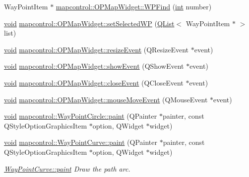 \begin{DoxyCompactItemize}
\item 
Way\-Point\-Item $\ast$ \hyperlink{group___o_p_map_widget_ga633b72f3ab012b8e9b8f6e58b75bfbb8}{mapcontrol\-::\-O\-P\-Map\-Widget\-::\-W\-P\-Find} (\hyperlink{ioapi_8h_a787fa3cf048117ba7123753c1e74fcd6}{int} number)
\item 
\hyperlink{group___u_a_v_objects_plugin_ga444cf2ff3f0ecbe028adce838d373f5c}{void} \hyperlink{group___o_p_map_widget_ga611fd47fbd108d887b40a1d1a878bd27}{mapcontrol\-::\-O\-P\-Map\-Widget\-::set\-Selected\-W\-P} (\hyperlink{class_q_list}{Q\-List}$<$ Way\-Point\-Item $\ast$ $>$ list)
\item 
\hyperlink{group___u_a_v_objects_plugin_ga444cf2ff3f0ecbe028adce838d373f5c}{void} \hyperlink{group___o_p_map_widget_gaeb81f004806916633910751cfe808de8}{mapcontrol\-::\-O\-P\-Map\-Widget\-::resize\-Event} (Q\-Resize\-Event $\ast$event)
\item 
\hyperlink{group___u_a_v_objects_plugin_ga444cf2ff3f0ecbe028adce838d373f5c}{void} \hyperlink{group___o_p_map_widget_gaa02db9787da06fe405061620b80605d4}{mapcontrol\-::\-O\-P\-Map\-Widget\-::show\-Event} (Q\-Show\-Event $\ast$event)
\item 
\hyperlink{group___u_a_v_objects_plugin_ga444cf2ff3f0ecbe028adce838d373f5c}{void} \hyperlink{group___o_p_map_widget_gabb098a73bed666626144c0da8332c609}{mapcontrol\-::\-O\-P\-Map\-Widget\-::close\-Event} (Q\-Close\-Event $\ast$event)
\item 
\hyperlink{group___u_a_v_objects_plugin_ga444cf2ff3f0ecbe028adce838d373f5c}{void} \hyperlink{group___o_p_map_widget_gaac8f40f4fe29d88750285c003b3f7b3f}{mapcontrol\-::\-O\-P\-Map\-Widget\-::mouse\-Move\-Event} (Q\-Mouse\-Event $\ast$event)
\item 
\hyperlink{group___u_a_v_objects_plugin_ga444cf2ff3f0ecbe028adce838d373f5c}{void} \hyperlink{group___o_p_map_widget_ga90e225e45f660d413d4d7ecac9bda3d9}{mapcontrol\-::\-Way\-Point\-Circle\-::paint} (Q\-Painter $\ast$painter, const Q\-Style\-Option\-Graphics\-Item $\ast$option, Q\-Widget $\ast$widget)
\item 
\hyperlink{group___u_a_v_objects_plugin_ga444cf2ff3f0ecbe028adce838d373f5c}{void} \hyperlink{group___o_p_map_widget_gaa2b1fdb88cca171d82b5705989370729}{mapcontrol\-::\-Way\-Point\-Curve\-::paint} (Q\-Painter $\ast$painter, const Q\-Style\-Option\-Graphics\-Item $\ast$option, Q\-Widget $\ast$widget)
\begin{DoxyCompactList}\small\item\em \hyperlink{group___o_p_map_widget_gaa2b1fdb88cca171d82b5705989370729}{Way\-Point\-Curve\-::paint} Draw the path arc. \end{DoxyCompactList}\item 

\end{DoxyCompactItemize}
